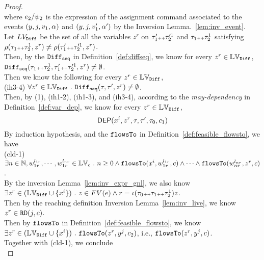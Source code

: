 \begin{proof}
\begin{equation}
\end{equation}
where $e_2 / \psi_2$ is the expression of the assignment command associated to the events $(y, j, v_1, \alpha)$ and $(y, j, v_1', \alpha')$ by the Inversion Lemma.~\ref{lem:inv_event}.
\\
Let $LV_{\mathtt{Diff}}$ be the set of all the variables $z^r$ on $\mathtt{\tau}_1' {\scriptscriptstyle ++} \mathtt{\tau}'^1_2$ and $\mathtt{\tau}_1 {\scriptscriptstyle ++} \mathtt{\tau}_2^1$ 
satisfying $\rho(\mathtt{\tau}_1 {\scriptscriptstyle ++} \mathtt{\tau}_2^1, z^r) \neq \rho(\mathtt{\tau}_1'{\scriptscriptstyle ++} \mathtt{\tau}'^1_2, z^r) $.
\\
Then, by the $\mathtt{Diff}_{\mathtt{seq}}$ in Definition~\ref{def:diffseq}, we know for every $z^r \in \mathbb{LV}_{\mathtt{Diff}}$,
$\mathtt{Diff}_{\mathtt{seq}}(\mathtt{\tau}_1 {\scriptscriptstyle ++} \mathtt{\tau}_2^1, \mathtt{\tau}_1'{\scriptscriptstyle ++} \mathtt{\tau}'^1_2, z^r) \neq \emptyset$. 
\\
Then we know the following for every $z^r \in \mathbb{LV}_{\mathtt{Diff}}$,
\\
(ih3-4) $\forall z^r \in \mathbb{LV}_{\mathtt{Diff}} ~.~ \mathtt{Diff}_{\mathtt{seq}}(\mathtt{\tau}, \mathtt{\tau}', z^r) \neq \emptyset$.
\\
Then, by (1), (ih1-2), (ih1-3), and (ih3-4),  according to the \emph{may-dependency} in Definition~\ref{def:var_dep}, we know for every $z^r \in \mathbb{LV}_{\mathtt{Diff}}$,
\[
  \mathsf{DEP}(x^i, z^r, \mathtt{\tau}, \mathtt{\tau}', \mathtt{\tau}_0, c_1)
\]
By induction hypothesis, and the $\mathtt{flowsTo}$ in Definition~\ref{def:feasible_flowsto}, we have 
\\
(cld-1) 
$\exists n \in \mathbb{N}, w_{1r}^{l_{1r}}, \cdots, w_{1r}^{l_{nr}} \in \mathbb{LV}_{{c}} ~.~ n \geq 0 \land
\mathtt{flowsTo}(x^i,  w_{1r}^{l_{1r}}, c) 
\land \cdots \land \mathtt{flowsTo}(w_{nr}^{l_{nr}}, z^r, c)$.
\\
By the inversion Lemma~\ref{lem:inv_expr_gnl}, we also know 
$\exists z^r \in (\mathbb{LV}_{\mathtt{Diff}} \cup \{x^i\} ) ~.~ z \in FV(e) 
\land r = \iota(\mathtt{\tau}_0 {\scriptscriptstyle ++} \mathtt{\tau}_1 {\scriptscriptstyle ++} \mathtt{\tau}_2^1) z$.
\\
Then by the reaching definition Inversion Lemma~\ref{lem:inv_live}, we know $z^r \in \mathtt{RD}(j, c)$.
\\
Then by $\mathtt{flowsTo}$ in Definition~\ref{def:feasible_flowsto}, 
we know 
$ \exists z^r \in (\mathbb{LV}_{\mathtt{Diff}} \cup \{x^i\} ) ~.~ \mathtt{flowsTo}(z^r, y^j, c_2)$, i.e., $\mathtt{flowsTo}(z^r, y^j, c)$.
\\
Together with (cld-1), we conclude 
\\

\end{proof}
